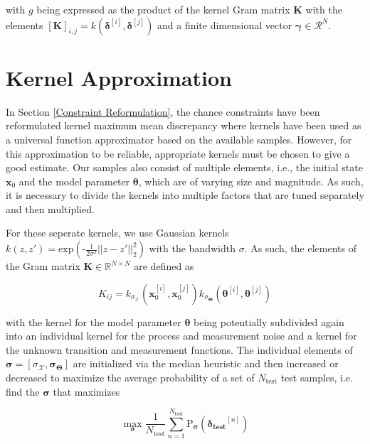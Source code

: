 with $g$ being expressed as the product of the kernel Gram matrix $\boldsymbol{K}$ with the elements $\left[ \boldsymbol{K} \right]_{i, j} = k(\boldsymbol{\delta}^{[i]}, \boldsymbol{\delta}^{[j]})$ and a finite dimensional vector $\boldsymbol{\gamma} \in \mathcal{R}^N$. 

\section{Kernel Approximation} \label{Kernel Approximation}

In Section \ref{Constraint Reformulation}, the chance constraints have been reformulated kernel maximum mean discrepancy where kernels have been used as a universal function approximator based on the available samples. However, for this approximation to be reliable, appropriate kernels must be chosen to give a good estimate. Our samples also consist of multiple elements, i.e., the initial state $\boldsymbol{x}_0$ and the model parameter $\boldsymbol{\theta}$, which are of varying size and magnitude. As such, it is necessary to divide the kernels into multiple factors that are tuned separately and then multiplied.

For these seperate kernels, we use Gaussian kernels $k(z,z') = \text{exp}\left(\text{-}\frac{1}{2\sigma^2} ||z - z'||_2^2 \right)$ with the bandwidth $\sigma$. As such, the elements of the Gram matrix $\boldsymbol{K} \in \mathbb{R}^{N \times N}$ are defined as

\begin{equation} \label{Kernel equation}
K_{ij} = k_{\sigma_\mathcal{X}}(\boldsymbol{x}_0^{[i]}, \boldsymbol{x}_0^{[j]}) k_{\sigma_{\boldsymbol{\Theta}}}(\boldsymbol{\theta}^{[i]}, \boldsymbol{\theta}^{[j]})
\end{equation}

with the kernel for the model parameter $\boldsymbol{\theta}$ being potentially subdivided again into an individual kernel for the process and measurement noise and a kernel for the unknown transition and measurement functions. The individual elements of $\boldsymbol{\sigma} = [\sigma_\mathcal{X}, \boldsymbol{\sigma}_{\boldsymbol{\Theta}}]$ are initialized via the median heuristic \cite{Damien_18} and then increased or decreased to maximize the average probability of a set of $N_\text{test}$ test samples, i.e. find the $\boldsymbol{\sigma}$ that maximizes

 \begin{equation} \label{Average Probability}
\max\limits_{\boldsymbol{\sigma}} \frac{1}{N_\text{test}}  \sum_{n= 1}^{N_\text{test}} \text{P}_{\boldsymbol{\sigma}} ( \boldsymbol{\delta_\text{test}}^{[n]} )
\end{equation}

